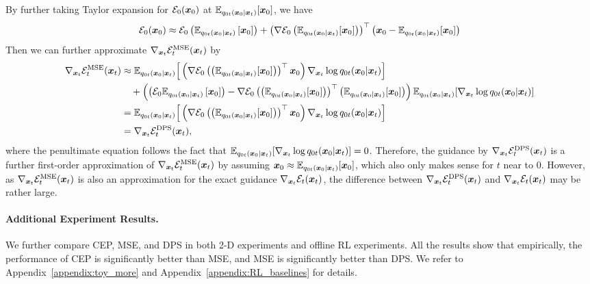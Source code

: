 By further taking Taylor expansion for ${\mathcal{E}}_0({\bm{x}}_0)$ at $\mathbb{E}_{q_{0t}({\bm{x}}_0|{\bm{x}}_t)}[{\bm{x}}_0]$, we have
\begin{equation*}
{\mathcal{E}}_0({\bm{x}}_0)
\approx
{\mathcal{E}}_0\left(\mathbb{E}_{q_{0t}({\bm{x}}_0|{\bm{x}}_t)}\left[{\bm{x}}_0\right]\right)
+ \left(\nabla{\mathcal{E}}_0\left(\mathbb{E}_{q_{0t}({\bm{x}}_0|{\bm{x}}_t)}[{\bm{x}}_0]\right)\right)^\top \left({\bm{x}}_0 - \mathbb{E}_{q_{0t}({\bm{x}}_0|{\bm{x}}_t)}[{\bm{x}}_0]\right)
\end{equation*}
Then we can further approximate $\nabla_{{\bm{x}}_t}{\mathcal{E}}_t^{\text{MSE}}({\bm{x}}_t)$ by
\begin{equation*}
\begin{aligned}
    \nabla_{{\bm{x}}_t}{\mathcal{E}}_t^{\text{MSE}}({\bm{x}}_t) &\approx \mathbb{E}_{q_{0t}({\bm{x}}_0|{\bm{x}}_t)}\Big[\left(\nabla{\mathcal{E}}_0\left(\left(\mathbb{E}_{q_{0t}({\bm{x}}_0|{\bm{x}}_t)}[{\bm{x}}_0]\right)\right)^\top {\bm{x}}_0\right) \nabla_{{\bm{x}}_t}\log q_{0t}({\bm{x}}_0|{\bm{x}}_t)\Big] \\
    &\quad + \left(\left({\mathcal{E}}_0\mathbb{E}_{q_{0t}({\bm{x}}_0|{\bm{x}}_t)}\left[{\bm{x}}_0\right]\right) - \nabla{\mathcal{E}}_0\left(\left(\mathbb{E}_{q_{0t}({\bm{x}}_0|{\bm{x}}_t)}[{\bm{x}}_0]\right)\right)^\top \left(\mathbb{E}_{q_{0t}({\bm{x}}_0|{\bm{x}}_t)}[{\bm{x}}_0]\right)\right)
    \mathbb{E}_{q_{0t}({\bm{x}}_0|{\bm{x}}_t)}[\nabla_{{\bm{x}}_t}\log q_{0t}({\bm{x}}_0|{\bm{x}}_t)] \\
    &= \mathbb{E}_{q_{0t}({\bm{x}}_0|{\bm{x}}_t)}\Big[\left(\nabla{\mathcal{E}}_0\left(\left(\mathbb{E}_{q_{0t}({\bm{x}}_0|{\bm{x}}_t)}[{\bm{x}}_0]\right)\right)^\top {\bm{x}}_0\right) \nabla_{{\bm{x}}_t}\log q_{0t}({\bm{x}}_0|{\bm{x}}_t)\Big] \\
    &= \nabla_{{\bm{x}}_t}{\mathcal{E}}_t^{\text{DPS}}({\bm{x}}_t),
\end{aligned}
\end{equation*}
where the penultimate equation follows the fact that $\mathbb{E}_{q_{0t}({\bm{x}}_0|{\bm{x}}_t)}[\nabla_{{\bm{x}}_t}\log q_{0t}({\bm{x}}_0|{\bm{x}}_t)] = 0$. Therefore, the guidance by $\nabla_{{\bm{x}}_t}{\mathcal{E}}_t^\text{DPS}({\bm{x}}_t)$ is a further first-order approximation of $\nabla_{{\bm{x}}_t}{\mathcal{E}}_t^{\text{MSE}}({\bm{x}}_t)$ by assuming ${\bm{x}}_0 \approx \mathbb{E}_{q_{0t}({\bm{x}}_0|{\bm{x}}_t)}[{\bm{x}}_0]$, which also only makes sense for $t$ near to $0$. However, as $\nabla_{{\bm{x}}_t}{\mathcal{E}}_t^{\text{MSE}}({\bm{x}}_t)$ is also an approximation for the exact guidance $\nabla_{{\bm{x}}_t}{\mathcal{E}}_t({\bm{x}}_t)$, the difference between $\nabla_{{\bm{x}}_t}{\mathcal{E}}_t^{\text{DPS}}({\bm{x}}_t)$ and $\nabla_{{\bm{x}}_t}{\mathcal{E}}_t({\bm{x}}_t)$ may be rather large.


\paragraph{Additional Experiment Results.}
We further compare CEP, MSE, and DPS in both 2-D experiments and offline RL experiments. All the results show that empirically, the performance of CEP is significantly better than MSE, and MSE is significantly better than DPS. We refer to Appendix~\ref{appendix:toy_more} and Appendix~\ref{appendix:RL_baselines} for details.












